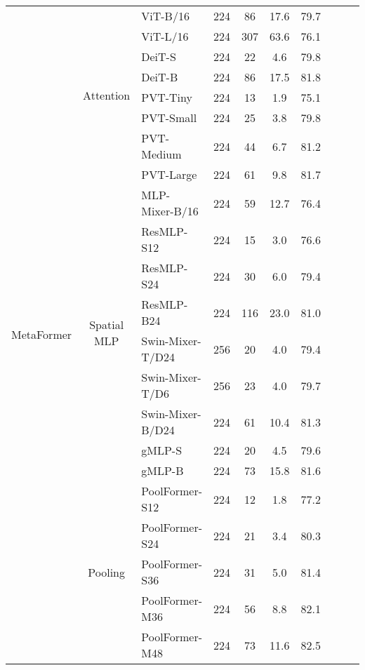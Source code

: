 \begin{table*}[t]
\begin{tabular}{c|clccccccc}
   \multirow{22}{*}{MetaFormer}  & \multirow{8}{*}{Attention} & \vitdot{} ViT-B/16 \cite{vit} & 224 &  86 & 17.6 & 79.7 \\
             &          & \vitdot{} ViT-L/16 \cite{vit} & 224 & 307 & 63.6 & 76.1 \\
             &          & \deitdot{} DeiT-S \cite{deit} & 224 & 22 & 4.6 & 79.8 \\
             &          & \deitdot{} DeiT-B \cite{deit} & 224 &  86 & 17.5 & 81.8 \\
             &          & \pvtdot{} PVT-Tiny \cite{pvt} & 224 & 13 & 1.9 & 75.1 \\
             &          & \pvtdot{} PVT-Small \cite{pvt} & 224 & 25 & 3.8 & 79.8 \\
             &          & \pvtdot{} PVT-Medium \cite{pvt} & 224 & 44 &  6.7 & 81.2 \\
             &          & \pvtdot{} PVT-Large \cite{pvt} & 224 & 61 &  9.8 & 81.7 \\
    \cline{2-7}
             & \multirow{9}{*}{Spatial MLP} & \mlpmixerdot{} MLP-Mixer-B/16 \cite{mlp-mixer} & 224 & 59 & 12.7 & 76.4 \\
             &             & \resmlp{} ResMLP-S12 \cite{resmlp} & 224 & 15 & 3.0 & 76.6 \\
             &             & \resmlp{} ResMLP-S24 \cite{resmlp} & 224 & 30 & 6.0 & 79.4 \\
             &             & \resmlp{} ResMLP-B24 \cite{resmlp} & 224 & 116 & 23.0 & 81.0 \\
             &             & \swinmixer{} Swin-Mixer-T/D24 \cite{swin} & 256 & 20 & 4.0 & 79.4 \\
             &             & \swinmixer{} Swin-Mixer-T/D6 \cite{swin} & 256 & 23 & 4.0 & 79.7 \\
             &             & \swinmixer{} Swin-Mixer-B/D24 \cite{swin} & 224 & 61 & 10.4 & 81.3 \\
             &             & \gmlp{} gMLP-S \cite{gmlp} & 224 & 20 & 4.5 & 79.6 \\
             &             & \gmlp{} gMLP-B \cite{gmlp} & 224 & 73 & 15.8 & 81.6 \\
    \cline{2-7}
             & \multirow{5}{*}{Pooling}  & \poolformer{} PoolFormer-S12 & 224 & 12 & 1.8 & 77.2 \\ &         & \poolformer{} PoolFormer-S24 & 224 & 21 & 3.4 & 80.3 \\
             &         & \poolformer{} PoolFormer-S36 & 224 & 31 & 5.0 & 81.4 \\ &         & \poolformer{} PoolFormer-M36 & 224 & 56 & 8.8 & 82.1 \\
             &         & \poolformer{} PoolFormer-M48 & 224 & 73 & 11.6 & 82.5 \\
    \bottomrule
             

\end{tabular}
\end{table*}
